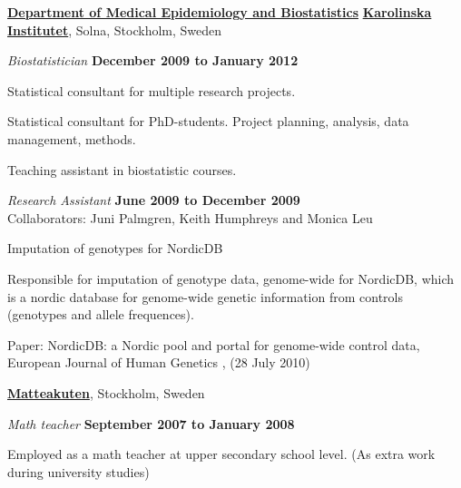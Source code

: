 \href{http://ki.se/ki/jsp/polopoly.jsp?d=9600}{\textbf{Department of Medical Epidemiology and Biostatistics}}
\href{http://www.ki.se/}{\textbf{Karolinska Institutet}}, Solna, Stockholm, Sweden
\begin{outerlist}
\item[] \textit{Biostatistician}%
        \hfill \textbf{December 2009 to January 2012}
\begin{innerlist}
\item Statistical consultant for multiple research projects.
\item Statistical consultant for PhD-students. Project planning, analysis, data management, methods.
\item Teaching assistant in biostatistic courses.
\end{innerlist}

\item[] \textit{Research Assistant}%
        \hfill \textbf{June 2009 to December 2009}
\\ Collaborators: Juni Palmgren, Keith Humphreys and Monica Leu
\begin{innerlist}
  \item Imputation of genotypes for NordicDB
  \begin{innerlist}
    \item Responsible for imputation of genotype data, genome-wide for NordicDB, which is a nordic database for genome-wide genetic information from controls (genotypes and allele frequences).
    \item Paper: NordicDB: a Nordic pool and portal for genome-wide control data, European Journal of Human Genetics , (28 July 2010)
  \end{innerlist}
\end{innerlist}

\end{outerlist}

\halfblankline

\href{http://www.matteakuten.se}{\textbf{Matteakuten}}, Stockholm, Sweden
\begin{outerlist}
\item[] \textit{Math teacher}%
        \hfill \textbf{September 2007 to January 2008}
\begin{innerlist}
\item Employed as a math teacher at upper secondary school level. (As extra work during university studies)
\end{innerlist}

\end{outerlist}

